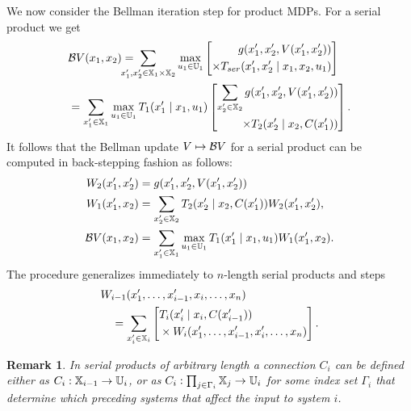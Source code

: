\documentclass[draft,conference]{IEEEtran}
\newtheorem{remark}{Remark}
\begin{document}
We now consider the Bellman iteration step for product MDPs. For a serial product we get
\begin{equation*}
\begin{aligned}
  & \bellman V (x_1, x_2) = \hspace{-5mm} \sum_{x_1', x_2' \in \X_1 \times \X_2} \max_{u_1 \in \U_1} \left[ \begin{aligned}
  	g(x_1', x_2', V(x_1', x_2')) \\
  	\times T_{ser}(x_1', x_2' \mid x_1, x_2, u_1)
  \end{aligned} \right] \\
  & = \sum_{x_1' \in \X_1} \max_{u_1 \in \U_1} T_1(x_1' \mid x_1, u_1 ) \left[ \begin{aligned}
   	\sum_{x_2' \in \X_2}  g(x_1', x_2', V(x_1', x_2')) \\
   	\times  T_2(x_2' \mid x_2, C(x_1'))
   \end{aligned} \right].
\end{aligned}
\end{equation*}
It follows that the Bellman update $V \mapsto \mathcal{B} V$ for a serial product can be computed in back-stepping fashion as follows:
\begin{equation*}
\begin{aligned}
  W_2(x_1', x_2') & = g(x_1', x_2', V(x_1', x_2')) \\
  W_1(x_1', x_2) & = \sum_{x_2' \in \mathbb{X}_2}  T_2(x_2' \mid x_2, C(x_1')) W_2(x_1', x_2'), \\
  \mathcal{B} V(x_1, x_2) & = \sum_{x_1' \in \mathbb{X}_1} \max_{u_1 \in \mathbb{U}_1} T_1(x_1' \mid x_1, u_1) W_1(x_1', x_2).
\end{aligned}
\end{equation*}
The procedure generalizes immediately to $n$-length serial products and steps
\begin{equation}
\label{eq:general_decomp}
\begin{aligned}
  & W_{i-1}(x_1', \ldots, x_{i-1}', x_i, \ldots, x_n) \\
  & \quad = \sum_{x_{i}' \in \X_{i}} \left[ \begin{aligned} & T_{i} (x_{i}' \mid x_{i}, C(x_{i-1}')) \\ 
   & \times W_{i} (x_1', \ldots, x_{i-1}', x_i', \ldots, x_n)
    \end{aligned} \right].
\end{aligned}
\end{equation}

\begin{remark}
  In serial products of arbitrary length a connection $C_i$ can be defined either as $C_i: \mathbb{X}_{i-1} \rightarrow \mathbb{U}_i$, or as $C_i: \prod_{j \in \Gamma_i} \mathbb{X}_j \rightarrow \mathbb{U}_i$ for some index set $\Gamma_i$ that determine which preceding systems that affect the input to system $i$.
\end{remark}
\end{document}
